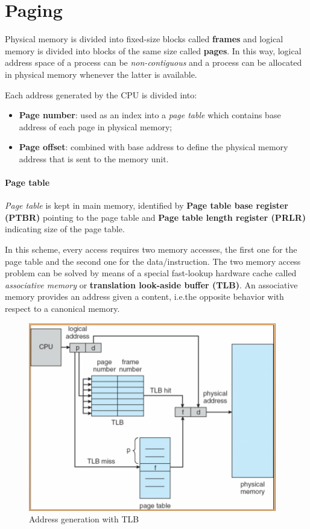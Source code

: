 \section{Paging}
Physical memory is divided into fixed-size blocks called \textbf{frames} and logical memory is divided into blocks of the same size called \textbf{pages}. In this way, logical address space of a process can be \emph{non-contiguous} and a process can be allocated in physical memory whenever the latter is available.

Each address generated by the CPU is divided into:
\begin{itemize}
\item \textbf{Page number}: used as an index into a \emph{page table} which contains base address of each page in physical memory;
\item \textbf{Page offset}: combined with base address to define the physical memory address that is sent to the memory unit.
\end{itemize}

\paragraph{Page table} \emph{Page table} is kept in main memory, identified by \textbf{Page table base register (PTBR)} pointing to the page table and \textbf{Page table length register (PRLR)} indicating size of the page table.

In this scheme, every access requires two memory accesses, the first one for the page table and the second one for the data/instruction. The two memory access problem can be solved by means of a special fast-lookup hardware cache called \emph{associative memory} or \textbf{translation look-aside buffer (TLB)}. An associative memory provides an address given a content, i.e.\@ the opposite behavior with respect to a canonical memory.

\begin{figure}[hbtp]
\centering
\includegraphics[scale=0.5]{images/memory_management/address_generation_tlb.jpg}
\caption{Address generation with TLB}
\end{figure}

